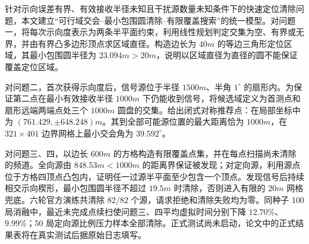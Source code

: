 针对示向误差有界、有效接收半径未知且干扰源数量未知条件下的快速定位清除问题，本文建立“可行域交会--最小包围圆清除--有限覆盖搜索”的统一模型。对问题一，将每次示向度表示为两条半平面约束，利用线性规划判定交集为空、有界或无界，并由有界凸多边形顶点求区域直径。构造边长为 $40\unit{m}$ 的等边三角形定位区域，其最小包围圆半径为 $23.094\unit{m}>20\unit{m}$，说明以区域直径为直径的圆不能保证覆盖定位区域。

对问题二，首次获得示向度后，信号源位于半径 $1500\unit{m}$、半角 $1^\circ$ 的扇形内。为保证第二点在最小有效接收半径 $1000\unit{m}$ 下仍能收到信号，将候选域定义为首测点和扇形远端两端点处三个 $1000\unit{m}$ 圆盘的交集。给出闭式对称推荐点：在局部坐标中为 $(761.429,\pm648.248)\unit{m}$。其到全部可能源位置的最大距离恰为 $1000\unit{m}$，在 $321\times401$ 边界网格上最小交会角为 $39.592^\circ$。

对问题三、四，以边长 $600\unit{m}$ 的方格构造有限覆盖点集，并在每点扫描尚未清除的频道。全向源由 $848.53\unit{m}<1000\unit{m}$ 的距离界保证被发现；对定向源，利用源点位于方格四顶点凸包内，证明任一过源半平面至少包含一个顶点。发现信号后持续相交示向楔形，最小包围圆半径不超过 $19.5\unit{m}$ 时清除，否则进入有限的 $20\unit{m}$ 网格兜底。六轮官方演练共清除 $82/82$ 个源，请求拒绝和清除失败均为零。同种子 100 局消融中，最近未完成点续扫使问题三、四平均虚拟时间分别下降 $12.70\%$、$9.99\%$；50 局定向源比例压力样本全部清除。正式测试尚未启动，论文中的正式结果表将在真实测试后据原始日志填写。

